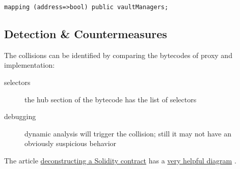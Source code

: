 \begin{lstlisting}[language=Solidity]
mapping (address=>bool) public vaultManagers;
\end{lstlisting}

\subsection{Detection \& Countermeasures}

The collisions can be identified by comparing the bytecodes of proxy and implementation:

\begin{description}
\item[selectors]{the hub section of the bytecode has the list of selectors}
\item[debugging]{dynamic analysis will trigger the collision; still it may not have an obviously suspicious behavior}
\end{description}

The article \href{article-deconstructing-contract}{deconstructing a Solidity contract} has a \href{https://gists.rawgit.com/ajsantander/23c032ec7a722890feed94d93dff574a/raw/a453b28077e9669d5b51f2dc6d93b539a76834b8/BasicToken.svg}{very helpful diagram} \cite{image-deconstruction-diagram}.

